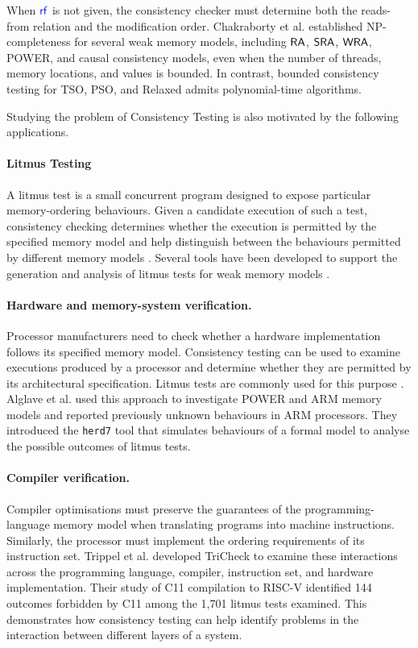 When $\rf$ is not given, the consistency checker must determine both the reads-from relation and the modification order. Chakraborty et al. \cite{ChakrabortyKMP24} established NP-completeness for several weak memory models, including $\mathsf{RA}$, $\mathsf{SRA}$, $\mathsf{WRA}$, POWER, and causal consistency models, even when the number of threads, memory locations, and values is bounded. In contrast, bounded consistency testing for TSO, PSO, and Relaxed admits polynomial-time algorithms.

Studying the problem of Consistency Testing is also motivated by the following applications.

\paragraph*{Litmus Testing} A litmus test is a small concurrent program designed to expose particular memory-ordering behaviours. Given a candidate execution of such a test, consistency checking determines whether the execution is permitted by the specified memory model and help distinguish between the behaviours permitted by different memory models \cite{MadorHaimAM11}. Several tools have been developed to support the generation and analysis of litmus tests for weak memory models  \cite{Alglave2012,LustigWPG17,herdtools7}.

\paragraph*{Hardware and memory-system verification.} Processor manufacturers need to check whether a hardware implementation follows its specified memory model. Consistency testing can be used to examine executions produced by a processor and determine whether they are permitted by its architectural specification. Litmus tests are commonly used for this purpose \cite{Alglave2011}.  Alglave et al. \cite{alglave2014herding} used this approach to investigate POWER and ARM memory models and reported previously unknown behaviours in ARM processors. They introduced the \texttt{herd7} \cite{herdtools7} tool that simulates behaviours of a formal model to analyse the possible outcomes of litmus tests.

\paragraph*{Compiler verification.} Compiler optimisations must preserve the guarantees of the programming-language memory model when translating programs into machine instructions. Similarly, the processor must implement the ordering requirements of its instruction set. Trippel et al. \cite{trippel2017tricheck} developed TriCheck to examine these interactions across the programming language, compiler, instruction set, and hardware implementation. Their study of C11 compilation to RISC-V identified 144 outcomes forbidden by C11 among the 1,701 litmus tests examined. This demonstrates how consistency testing can help identify problems in the interaction between different layers of a system. 

